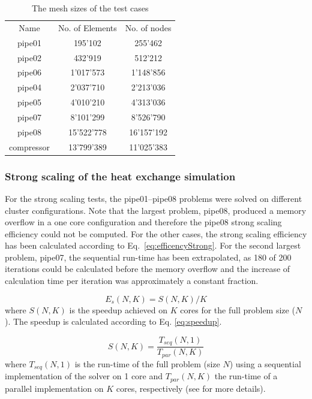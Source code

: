 \documentclass[a4paper,twoside]{article}
\begin{document}
\begin{table}
	\centering
		\begin{tabular} {|c|c|c|}
			\hline
			Name & No. of Elements & No. of nodes \\			
			pipe01 & 195'102 & 255'462 \\ \hline
			pipe02 & 432'919 & 512'212 \\ \hline
			pipe06 & 1'017'573 & 1'148'856 \\ \hline
			pipe04 & 2'037'710 & 2'213'036 \\ \hline
			pipe05 & 4'010'210 & 4'313'036 \\ \hline			
			pipe07 & 8'101'299 & 8'526'790 \\ \hline
			pipe08 & 15'522'778 & 16'157'192 \\ \hline
			compressor & 13'799'389  & 11'025'383 \\ \hline
		\end{tabular}
	\caption{The mesh sizes of the test cases}
	\label{tab:MeshSize}
\end{table}

\subsubsection{Strong scaling of the heat exchange simulation}

For the strong scaling tests, the pipe01--pipe08 problems were solved on different cluster configurations. Note that the largest problem, pipe08, produced a memory overflow in a one core configuration and therefore the pipe08 strong scaling efficiency could not be computed. For the other cases, the strong scaling efficiency has been calculated according to Eq.~\ref{eq:efficencyStrong}. For the second largest problem, pipe07, the sequential run-time has been extrapolated, as 180 of 200 iterations could be calculated before the memory overflow and the increase of calculation time per iteration was approximately a constant fraction.

\begin{equation}
\label{eq:efficencyStrong}
E_s(N,K) = S(N,K) / K 
\end{equation}
where $S(N,K)$ is the speedup achieved on $K$ cores for the full problem size ($N$). The speedup is calculated according to Eq. \ref{eq:speedup}.

\begin{equation}
\label{eq:speedup}
S(N,K) = \frac{T_{seq}(N,1)}{T_{par}(N,K)}
\end{equation}
where $T_{seq}(N,1)$ is the run-time of the full problem (size $N$) using a sequential implementation of the solver on 1 core and $T_{par}(N,K)$ the run-time of a parallel implementation on $K$ cores, respectively (see \cite{kaminsky15} for more details).
\end{document}
